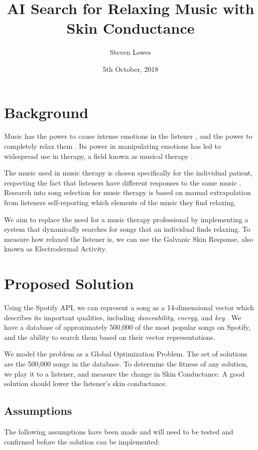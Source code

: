 \documentclass{article}
\title{AI Search for Relaxing Music with Skin Conductance}
\author{Steven Lowes}
\date{5th October, 2018}
\begin{document}
	\maketitle
	
	\section{Background}
	Music has the power to cause intense emotions in the listener \cite{agostino_how_2008}, and the power to completely relax them \cite{elliott_relaxing_2011}. Its power in manipulating emotions has led to widespread use in therapy, a field known as musical therapy \cite{american_music_therapy_association_definition_nodate}.
	
	The music used in music therapy is chosen specifically for the individual patient, respecting the fact that listeners have different responses to the same music \cite{american_music_therapy_association_definition_nodate}. Research into song selection for music therapy is based on manual extrapolation from listeners self-reporting which elements of the music they find relaxing.
	
	We aim to replace the need for a music therapy professional by implementing a system that dynamically searches for songs that an individual finds relaxing. To measure how relaxed the listener is, we can use the Galvanic Skin Response, also known as Electrodermal Activity.
	
	\section{Proposed Solution}
	Using the Spotify API, we can represent a song as a 14-dimensional vector which describes its important qualities, including \emph{danceability}, \emph{energy}, and \emph{key} \cite{spotify_get_nodate, jehan_analyzer_nodate}. We have a database of approximately 500,000 of the most popular songs on Spotify, and the ability to search them based on their vector representations.
	
	We model the problem as a Global Optimization Problem. The set of solutions are the 500,000 songs in the database. To determine the fitness of any solution, we play it to a listener, and measure the change in Skin Conductance. A good solution should lower the listener's skin conductance.
	
	\subsection{Assumptions}
	The following assumptions have been made and will need to be tested and confirmed before the solution can be implemented:
	
\end{document}

